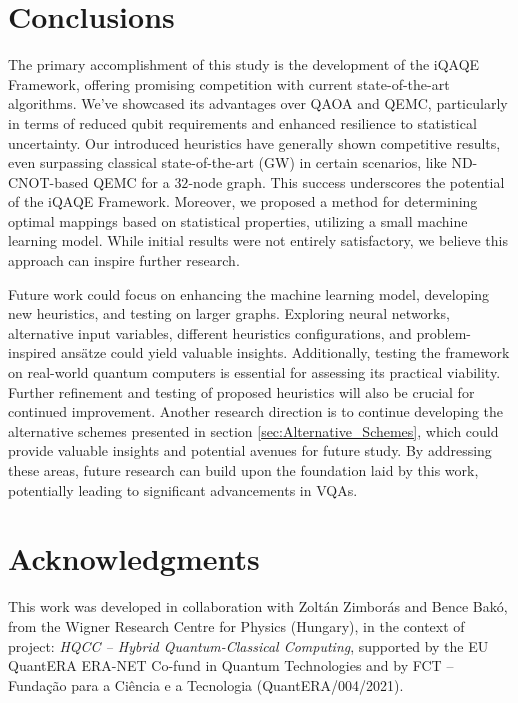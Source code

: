 \section{Conclusions}
\label{sec:Conclusions}
The primary accomplishment of this study is the development of the iQAQE Framework, offering promising competition with current state-of-the-art algorithms. We've showcased its advantages over QAOA and QEMC, particularly in terms of reduced qubit requirements and enhanced resilience to statistical uncertainty. Our introduced heuristics have generally shown competitive results, even surpassing classical state-of-the-art (GW) in certain scenarios, like ND-CNOT-based QEMC for a $32$-node graph. This success underscores the potential of the iQAQE Framework. Moreover, we proposed a method for determining optimal mappings based on statistical properties, utilizing a small machine learning model. While initial results were not entirely satisfactory, we believe this approach can inspire further research.

Future work could focus on enhancing the machine learning model, developing new heuristics, and testing on larger graphs. Exploring neural networks, alternative input variables, different heuristics configurations, and problem-inspired ansätze could yield valuable insights. Additionally, testing the framework on real-world quantum computers is essential for assessing its practical viability. Further refinement and testing of proposed heuristics will also be crucial for continued improvement. Another research direction is to continue developing the alternative schemes presented in section \ref{sec:Alternative_Schemes}, which could provide valuable insights and potential avenues for future study. By addressing these areas, future research can build upon the foundation laid by this work, potentially leading to significant advancements in VQAs.


\section*{Acknowledgments}
\label{sec:Acknowledgments}
This work was developed in collaboration with Zoltán Zimborás and Bence Bakó, from the Wigner Research Centre for Physics (Hungary), in the context of project: \textit{HQCC – Hybrid Quantum-Classical Computing}, supported by the EU QuantERA ERA-NET Co-fund in Quantum Technologies and by FCT -- Funda\c{c}\~{a}o para a Ci\^{e}ncia e a Tecnologia (QuantERA/004/2021).

